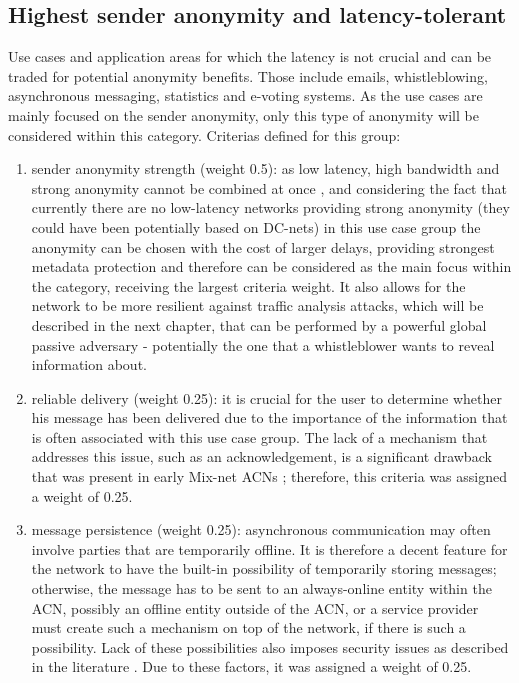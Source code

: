 \subsection{Highest sender anonymity and latency-tolerant}
Use cases and application areas for which the latency is not crucial and can be traded for potential anonymity benefits. Those include emails, whistleblowing, asynchronous messaging, statistics and e-voting systems.
As the use cases are mainly focused on the sender anonymity, only this type of anonymity will be considered within this category.
Criterias defined for this group:
\begin{enumerate}
    \item  sender anonymity strength (weight 0.5): as low latency, high bandwidth and strong anonymity cannot be combined at once \cite{anonymity-trillema}, and considering the fact that currently there are no low-latency networks providing strong anonymity (they could have been potentially based on DC-nets) in this use case group the anonymity can be chosen with the cost of larger delays, providing strongest metadata protection and therefore can be considered as the main focus within the category, receiving the largest criteria weight. It also allows for the network to be more resilient against traffic analysis attacks, which will be described in the next chapter, that can be performed by a powerful global passive adversary - potentially the one that a whistleblower wants to reveal information about.
    \item reliable delivery (weight 0.25): it is crucial for the user to determine whether his message has been delivered due to the importance of the information that is often associated with this use case group. The lack of a mechanism that addresses this issue, such as an acknowledgement, is a significant drawback that was present in early Mix-net ACNs \cite{mix-net-reliability}; therefore, this criteria was assigned a weight of 0.25.
    \item message persistence (weight 0.25): asynchronous communication may often involve parties that are temporarily offline. It is therefore a decent feature for the network to have the built-in possibility of temporarily storing messages; otherwise, the message has to be sent to an always-online entity within the ACN, possibly an offline entity outside of the ACN, or a service provider must create such a mechanism on top of the network, if there is such a possibility. Lack of these possibilities also imposes security issues as described in the literature \cite{two-cents-post-office}. Due to these factors, it was assigned a weight of 0.25.
\end{enumerate}

